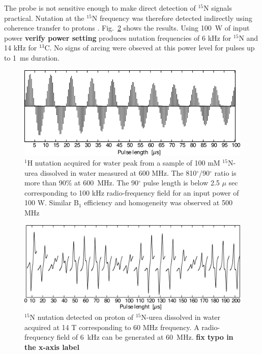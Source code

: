 \documentclass[preprint,12pt]{article}
\newcommand{\todo}[1]{{\color{red}\textbf{#1}}}
\newcommand{\fig}[1]{Fig.~\ref{#1}}
\begin{document}
The probe is not sensitive enough to make direct detection of $^{15}$N signals practical. Nutation at the
$^{15}$N frequency was therefore detected indirectly using coherence transfer to protons \cite{bax_indirect}. 
\fig{fig:15N-nutation} shows the results. Using 100~W of input power \todo{verify power setting} 
produces nutation frequencies of 6 kHz for $^{15}$N and 14 kHz for $^{13}$C. 
No signs of arcing were obseved at this power level for pulses up to 1~ms duration.

\begin{figure}
\centering
\includegraphics[width=.7\linewidth,keepaspectratio=true]{./figures/ms5n17-tlp-sp-150218-1-Hnutation-171216-103.png} 
\caption{$^1$H nutation acquired for water peak from a sample of 100 mM $^{15}$N-urea dissolved in water measured at 600 MHz. The 810$^{\circ}$/90$^{\circ}$ ratio is more than 90\% at 600~MHz. The 90$^{\circ}$ pulse length is below 2.5 $\mu$ sec corresponding to 100 kHz radio-frequency field for an input power of 100 W. Similar B$_{1}$ efficiency and homogeneity was observed at 500 MHz}
\label{fig:1H-nutation} 
\end{figure}

\begin{figure}
\centering
\includegraphics[width=.7\linewidth,keepaspectratio=true]{./figures/ms5n17-tlp-sp-150218-15-Nnutation-171215-003.png} 
\caption{$^{15}$N nutation detected on proton of $^{15}$N-urea dissolved in water acquired at 14 T corresponding to 60 MHz frequency. A radio-frequency field of 6~kHz can be generated at 60~MHz.
\todo{fix typo in the x-axis label}
}
\label{fig:15N-nutation} 
\end{figure}
\end{document}
